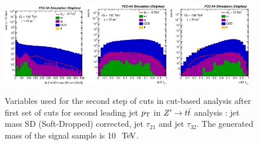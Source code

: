 \documentclass{cernrep}
\begin{document}
\begin{figure}[!htb]\centering
\includegraphics[width=0.32\textwidth]{Fig/Zptt/Jet2_trk02_SD_Cor_m_sel1_nostack_log.eps}
\includegraphics[width=0.32\textwidth]{Fig/Zptt/Jet2_tau21_sel1_nostack_log.eps}
\includegraphics[width=0.32\textwidth]{Fig/Zptt/Jet2_tau32_sel1_nostack_log.eps}
\caption{Variables used for the second step of cuts in cut-based analysis after first set of cuts for second leading jet $p\sb{\scriptstyle\mathrm{T}}$ in $Z^{\prime} \rightarrow t\bar{t}$ analysis : jet mass SD (Soft-Dropped) corrected, jet $\tau_{21}$ and jet $\tau_{32}$. The generated mass of the signal sample is 10 $\TeV$.}
\label{fig:Zptt_sel1_cut}
\end{figure}
\end{document}
